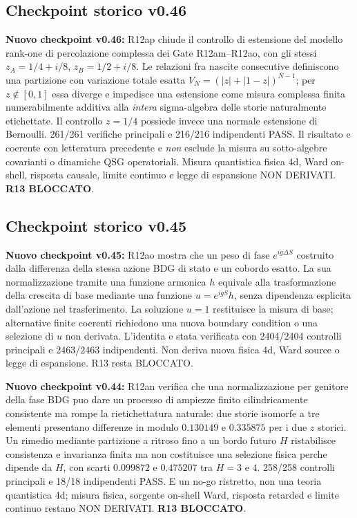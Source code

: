 \documentclass[11pt,a4paper]{article}
\begin{document}
\subsection*{Checkpoint storico v0.46}

\textbf{Nuovo checkpoint v0.46:} R12ap chiude il controllo di estensione del modello rank-one di percolazione complessa dei Gate R12am--R12ao, con gli stessi $z_A=1/4+i/8$, $z_B=1/2+i/8$. Le relazioni fra nascite consecutive definiscono una partizione con variazione totale esatta $V_N=(|z|+|1-z|)^{N-1}$; per $z\notin[0,1]$ essa diverge e impedisce una estensione come misura complessa finita numerabilmente additiva alla \emph{intera} sigma-algebra delle storie naturalmente etichettate. Il controllo $z=1/4$ possiede invece una normale estensione di Bernoulli. 261/261 verifiche principali e 216/216 indipendenti PASS. Il risultato e coerente con letteratura precedente e \emph{non} esclude la misura su sotto-algebre covarianti o dinamiche QSG operatoriali. Misura quantistica fisica 4d, Ward on-shell, risposta causale, limite continuo e legge di espansione NON DERIVATI. \textbf{R13 BLOCCATO}.\par\medskip

\subsection*{Checkpoint storico v0.45}

\textbf{Nuovo checkpoint v0.45:} R12ao mostra che un peso di fase $e^{ig\Delta S}$ costruito dalla differenza della stessa azione BDG di stato e un cobordo esatto. La sua normalizzazione tramite una funzione armonica $h$ equivale alla trasformazione della crescita di base mediante una funzione $u=e^{igS}h$, senza dipendenza esplicita dall'azione nel trasferimento. La soluzione $u=1$ restituisce la misura di base; alternative finite coerenti richiedono una nuova boundary condition o una selezione di $u$ non derivata. L'identita e stata verificata con 2404/2404 controlli principali e 2463/2463 indipendenti. Non deriva nuova fisica 4d, Ward source o legge di espansione. R13 resta BLOCCATO.\par


\textbf{Nuovo checkpoint v0.44:} R12an verifica che una normalizzazione per genitore della fase BDG puo dare un processo di ampiezze finito cilindricamente consistente ma rompe la rietichettatura naturale: due storie isomorfe a tre elementi presentano differenze in modulo $0.130149$ e $0.335875$ per i due $z$ storici. Un rimedio mediante partizione a ritroso fino a un bordo futuro $H$ ristabilisce consistenza e invarianza finita ma non costituisce una selezione fisica perche dipende da $H$, con scarti $0.099872$ e $0.475207$ tra $H=3$ e $4$. 258/258 controlli principali e 18/18 indipendenti PASS. E un no-go ristretto, non una teoria quantistica 4d; misura fisica, sorgente on-shell Ward, risposta retarded e limite continuo restano NON DERIVATI. \textbf{R13 BLOCCATO}.\par\medskip
\end{document}
